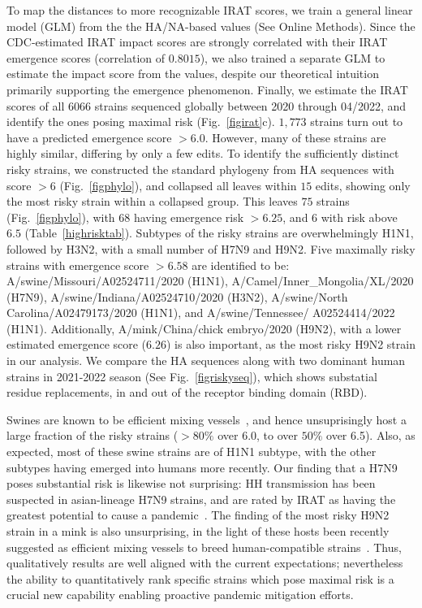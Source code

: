 \documentclass[onecolumn, compsoc,10pt]{IEEEtran}
\def\METHODS{Online Methods\xspace}
\begin{document}
To map the \enet distances to  more recognizable IRAT scores, we  train a general linear model (GLM)  from the  the HA/NA-based \erisk values (See \METHODS). Since the CDC-estimated IRAT impact scores are strongly correlated with their IRAT emergence scores (correlation of $0.8015$), we also trained a separate GLM to estimate the impact score from the \erisk values, despite our theoretical intuition primarily supporting the emergence phenomenon.  Finally,  we estimate the  IRAT scores of all  $6066$  \infl strains sequenced globally between 2020 through 04/2022, and identify the ones posing maximal risk (Fig.~\ref{figirat}c). $1,773$ strains turn out to have a predicted emergence score $>6.0$. However, many of these strains are highly similar, differing by only a few edits. To identify the sufficiently distinct risky strains, we constructed the standard phylogeny from  HA sequences with score $>6$ (Fig.~\ref{figphylo}), and collapsed all leaves within $15$ edits, showing only the most risky strain within a collapsed group. This leaves $75$ strains (Fig.~\ref{figphylo}), with $68$ having emergence risk $>6.25$, and $6$ with  risk above $6.5$ (Table~\ref{highrisktab}). Subtypes of the   risky strains are overwhelmingly H1N1, followed by H3N2, with a  small number of H7N9 and H9N2. Five maximally risky strains with emergence score $>6.58$ are identified to be: 
A/swine/Missouri/A02524711/2020 (H1N1), A/Camel/Inner\_Mongolia/XL/2020 (H7N9), A/swine/Indiana/A02524710/2020 (H3N2), A/swine/North Carolina/A02479173/2020 (H1N1), and A/swine/Tennessee/ A02524414/2022 (H1N1).  Additionally,  A/mink/China/chick embryo/2020 (H9N2),  with a lower estimated emergence score ($6.26$) is also important, as the most risky H9N2 strain in our analysis. We compare the HA sequences along with two dominant human strains in 2021-2022 season (See Fig.~\ref{figriskyseq}), which shows substatial residue replacements, in and out of the receptor binding domain (RBD).


Swines are known to be efficient mixing vessels~\cite{ma2009pig,nelson2018origins,reid2003origin,Baumann}, and hence unsuprisingly host a large fraction of the risky strains ($>80\%$ over 6.0, to over $50\%$ over 6.5). Also, as  expected, most of these swine strains are of  H1N1 subtype, with the other subtypes  having emerged into humans more recently. Our finding that a H7N9 poses substantial risk is likewise not surprising:
HH transmission has been suspected in asian-lineage H7N9 strains, and are rated by IRAT as having the greatest potential to cause a pandemic~\cite{qi2013probable}. The finding of  the most risky H9N2 strain in a mink is also unsurprising, in the light of these hosts  been recently suggested as efficient mixing vessels to breed human-compatible strains~\cite{sun2021mink}. Thus,  qualitatively results  are well aligned with the current expectations; nevertheless the ability to quantitatively rank  specific strains which pose maximal risk is a crucial new capability enabling proactive pandemic mitigation efforts.
\end{document}
